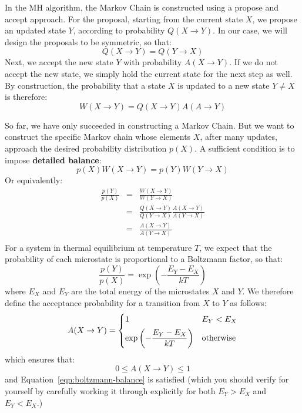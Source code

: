 \documentclass[12pt]{article}
\begin{document}
In the MH algorithm, the Markov Chain is constructed using a propose
and accept approach.  For the proposal, starting from the current
state $X$, we propose an updated state $Y$, according to probability
$Q(X \to Y)$.  In our case, we will design the proposals to be
symmetric, so that:
\begin{equation}
\label{eqn:symmetric}
Q(X \to Y) = Q(Y \to X)
\end{equation}
Next, we accept the new state $Y$ with
probability $A(X \to Y)$.  If we do not accept the new state, we
simply hold the current state for the next step as well.
By construction, the probability that a state $X$ is updated to a new
state $Y \ne X$ is therefore:
$$W(X \to Y) = Q(X \to Y) A(A \to Y)$$

So far, we have only succeeded in constructing a Markov Chain.  But we
want to construct the specific Markov chain whose elements $X$, after
many updates, approach the desired probability distribution $p(X)$.
A sufficient condition is to impose {\bf
  detailed balance}:
\begin{equation}
p(X) W(X \to Y) = p(Y) W(Y \to X)
\end{equation}
Or equivalently:
\begin{eqnarray*}
 \frac{p(Y)}{p(X)} &=& \frac{W(X \to Y)}{W(Y \to X)} \\
                   &=& \frac{Q(X \to Y)}{Q(Y \to X)} \frac{A(X \to Y)}{A(Y \to X)} \\
                   &=& \frac{A(X \to Y)}{A(Y \to X)} \\
\end{eqnarray*}
For a system in thermal equilibrium at temperature $T$, we expect that
the probability of each microstate is proportional to a Boltzmann factor,
so that:
\begin{equation}
\label{eqn:boltzmann-balance}
  \frac{p(Y)}{p(X)} = \exp\left( -\frac{E_Y - E_X}{kT} \right)
\end{equation}
where $E_X$ and $E_Y$ are the total energy of the microstates $X$ and $Y$.
We therefore define the acceptance probability for a transition from $X$ to $Y$ as follows:
\begin{equation}
  A(X \to Y) =
  \begin{cases}
    1 & E_Y < E_X \\[4pt]
    \displaystyle \exp\left( -\frac{E_Y - E_X}{kT} \right) & {\rm otherwise} \\
  \end{cases}
\end{equation}
which ensures that:
$$0 \leq A(X \to Y) \leq 1$$
and Equation~\ref{eqn:boltzmann-balance} is satisfied (which you
should verify for yourself by carefully working it through explicitly
for both $E_Y > E_X$ and $E_Y < E_X$.)
\end{document}
